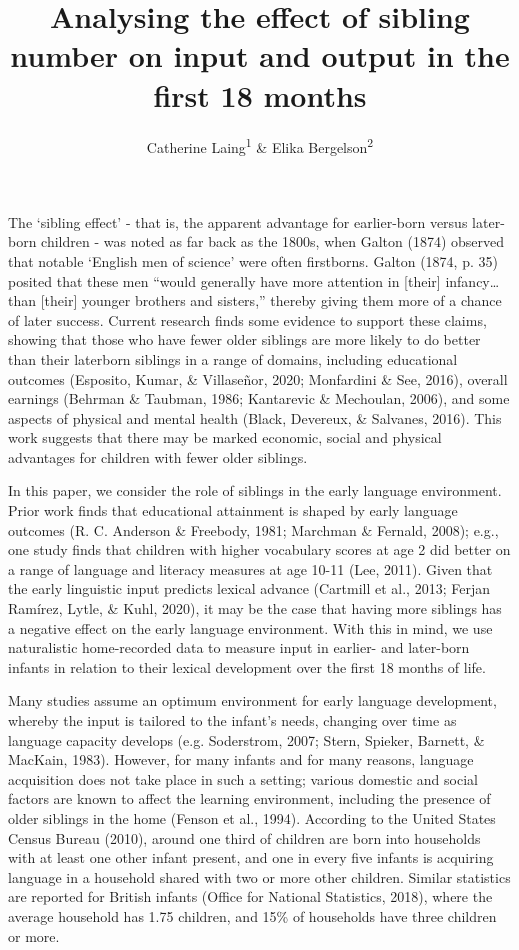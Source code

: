 \documentclass[
  english,
  man,floatsintext]{apa6}
\title{Analysing the effect of sibling number on input and output in the first 18 months}
\author{Catherine Laing\textsuperscript{1} \& Elika Bergelson\textsuperscript{2}}
\date{}
\affiliation{\vspace{0.5cm}\textsuperscript{1} University of York, York, UK\\\textsuperscript{2} Duke University, Durham, NC, USA}
\begin{document}
\maketitle

The `sibling effect' - that is, the apparent advantage for earlier-born versus later-born children - was noted as far back as the 1800s, when Galton (1874) observed that notable `English men of science' were often firstborns. Galton (1874, p. 35) posited that these men ``would generally have more attention in {[}their{]} infancy\ldots than {[}their{]} younger brothers and sisters,'' thereby giving them more of a chance of later success. Current research finds some evidence to support these claims, showing that those who have fewer older siblings are more likely to do better than their laterborn siblings in a range of domains, including educational outcomes (Esposito, Kumar, \& Villaseñor, 2020; Monfardini \& See, 2016), overall earnings (Behrman \& Taubman, 1986; Kantarevic \& Mechoulan, 2006), and some aspects of physical and mental health (Black, Devereux, \& Salvanes, 2016). This work suggests that there may be marked economic, social and physical advantages for children with fewer older siblings.

In this paper, we consider the role of siblings in the early language environment. Prior work finds that educational attainment is shaped by early language outcomes (R. C. Anderson \& Freebody, 1981; Marchman \& Fernald, 2008); e.g., one study finds that children with higher vocabulary scores at age 2 did better on a range of language and literacy measures at age 10-11 (Lee, 2011). Given that the early linguistic input predicts lexical advance (Cartmill et al., 2013; Ferjan Ramírez, Lytle, \& Kuhl, 2020), it may be the case that having more siblings has a negative effect on the early language environment. With this in mind, we use naturalistic home-recorded data to measure input in earlier- and later-born infants in relation to their lexical development over the first 18 months of life.

Many studies assume an optimum environment for early language development, whereby the input is tailored to the infant's needs, changing over time as language capacity develops (e.g. Soderstrom, 2007; Stern, Spieker, Barnett, \& MacKain, 1983). However, for many infants and for many reasons, language acquisition does not take place in such a setting; various domestic and social factors are known to affect the learning environment, including the presence of older siblings in the home (Fenson et al., 1994). According to the United States Census Bureau (2010), around one third of children are born into households with at least one other infant present, and one in every five infants is acquiring language in a household shared with two or more other children. Similar statistics are reported for British infants (Office for National Statistics, 2018), where the average household has 1.75 children, and 15\% of households have three children or more.
\end{document}

